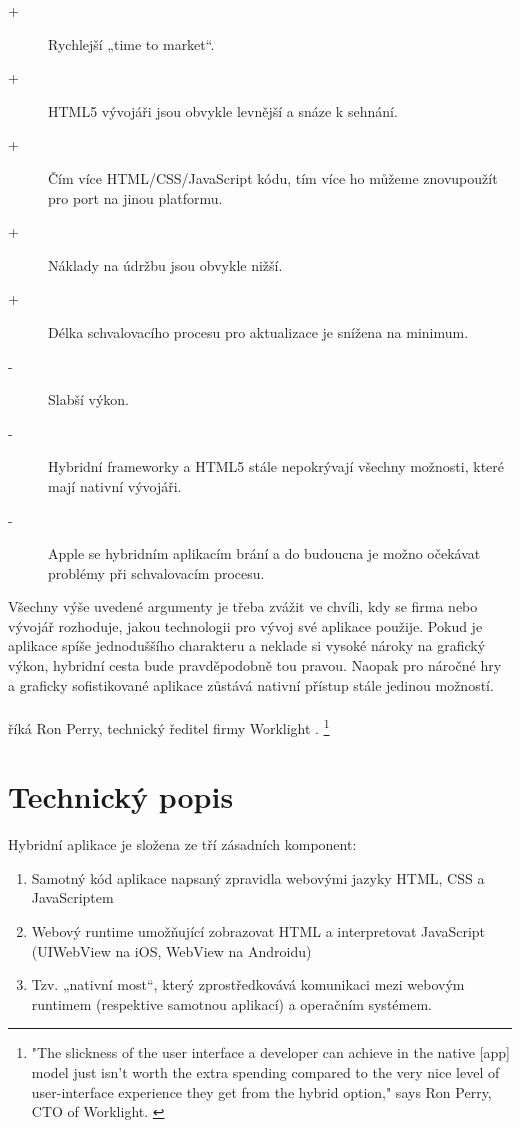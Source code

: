 \begin{description}
        \item[+] Rychlejší „time to market“.
        \item[+] HTML5 vývojáři jsou obvykle levnější a snáze k sehnání.
        \item[+] Čím více HTML/CSS/JavaScript kódu, tím více ho můžeme znovupoužít pro port na jinou platformu.
        \item[+] Náklady na údržbu jsou obvykle nižší.
        \item[+] Délka schvalovacího procesu pro aktualizace je snížena na minimum.
        \item[-] Slabší výkon.
        \item[-] Hybridní frameworky a HTML5 stále nepokrývají všechny možnosti, které mají nativní vývojáři.
        \item[-] Apple se hybridním aplikacím brání a do budoucna je možno očekávat problémy při schvalovacím procesu.
\end{description}

Všechny výše uvedené argumenty je třeba zvážit ve chvíli, kdy se firma nebo vývojář rozhoduje, jakou technologii pro vývoj své aplikace použije. Pokud je aplikace spíše jednoduššího charakteru a neklade si vysoké nároky na grafický výkon, hybridní cesta bude pravděpodobně tou pravou. Naopak pro náročné hry a graficky sofistikované aplikace zůstává nativní přístup stále jedinou možností.\\ \\
\textit{} říká Ron Perry, technický ředitel firmy Worklight \cite{hybrid_app_technology_overview}.
\footnote{"The slickness of the user interface a developer can achieve in the native [app] model just isn’t worth the extra spending compared to the very nice level of user-interface experience they get from the hybrid option," says Ron Perry, CTO of Worklight. \cite{hybrid_app_technology_overview}}

\section{Technický popis} \label{Sec:TechnickyPopis}
Hybridní aplikace je složena ze tří zásadních komponent:

\begin{enumerate}
	\item Samotný kód aplikace napsaný zpravidla webovými jazyky HTML, CSS a JavaScriptem
	\item Webový runtime umožňující zobrazovat HTML a interpretovat JavaScript (UIWebView na iOS, WebView na Androidu)
	\item Tzv. „nativní most“, který zprostředkovává komunikaci mezi webovým runtimem (respektive samotnou aplikací) a operačním systémem.
\end{enumerate}


